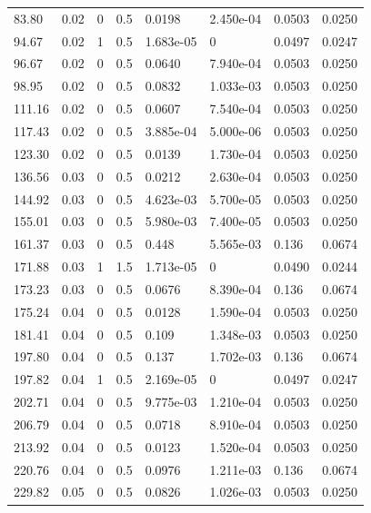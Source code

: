 \documentclass[preview]{standalone}
\begin{document}
{{\begin{tabular}{L{1.2cm}C{1.2cm} C{0.3cm}C{0.5cm} C{1.4cm}C{1.4cm} C{1.4cm}C{1.4cm}}
  83.80  &  0.02  & 0     & 0.5 &  0.0198  & 2.450e-04  & 0.0503 &  0.0250   \\ 
  94.67  &  0.02  & 1     & 0.5 &  1.683e-05  & 0  & 0.0497 &  0.0247   \\ 
  96.67  &  0.02  & 0     & 0.5 &  0.0640  & 7.940e-04  & 0.0503 &  0.0250   \\ 
  98.95  &  0.02  & 0     & 0.5 &  0.0832  & 1.033e-03  & 0.0503 &  0.0250   \\ 
  111.16  &  0.02  & 0     & 0.5 &  0.0607  & 7.540e-04  & 0.0503 &  0.0250   \\ 
  117.43  &  0.02  & 0     & 0.5 &  3.885e-04  & 5.000e-06  & 0.0503 &  0.0250   \\ 
  123.30  &  0.02  & 0     & 0.5 &  0.0139  & 1.730e-04  & 0.0503 &  0.0250   \\ 
  136.56  &  0.03  & 0     & 0.5 &  0.0212  & 2.630e-04  & 0.0503 &  0.0250   \\ 
  144.92  &  0.03  & 0     & 0.5 &  4.623e-03  & 5.700e-05  & 0.0503 &  0.0250   \\ 
  155.01  &  0.03  & 0     & 0.5 &  5.980e-03  & 7.400e-05  & 0.0503 &  0.0250   \\ 
  161.37  &  0.03  & 0     & 0.5 &  0.448  & 5.565e-03  & 0.136 &  0.0674   \\ 
  171.88  &  0.03  & 1     & 1.5 &  1.713e-05  & 0  & 0.0490 &  0.0244   \\ 
  173.23  &  0.03  & 0     & 0.5 &  0.0676  & 8.390e-04  & 0.136 &  0.0674   \\ 
  175.24  &  0.04  & 0     & 0.5 &  0.0128  & 1.590e-04  & 0.0503 &  0.0250   \\ 
  181.41  &  0.04  & 0     & 0.5 &  0.109  & 1.348e-03  & 0.0503 &  0.0250   \\ 
  197.80  &  0.04  & 0     & 0.5 &  0.137  & 1.702e-03  & 0.136 &  0.0674   \\ 
  197.82  &  0.04  & 1     & 0.5 &  2.169e-05  & 0  & 0.0497 &  0.0247   \\ 
  202.71  &  0.04  & 0     & 0.5 &  9.775e-03  & 1.210e-04  & 0.0503 &  0.0250   \\ 
  206.79  &  0.04  & 0     & 0.5 &  0.0718  & 8.910e-04  & 0.0503 &  0.0250   \\ 
  213.92  &  0.04  & 0     & 0.5 &  0.0123  & 1.520e-04  & 0.0503 &  0.0250   \\ 
  220.76  &  0.04  & 0     & 0.5 &  0.0976  & 1.211e-03  & 0.136 &  0.0674   \\ 
  229.82  &  0.05  & 0     & 0.5 &  0.0826  & 1.026e-03  & 0.0503 &  0.0250   \\ 

\end{tabular}}}
\end{document}
